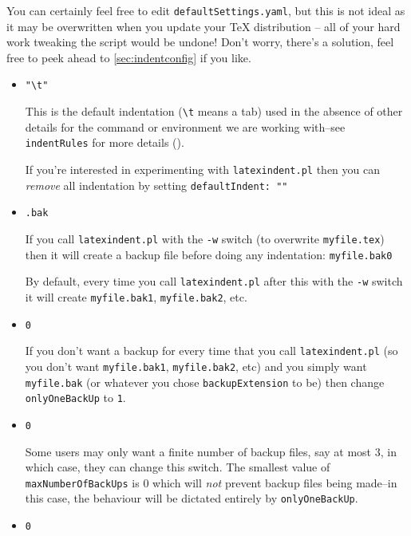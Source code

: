 \documentclass[11pt]{article}
\newcommand{\verbitem}[1]{\small\PVerb{#1}}
\begin{document}
You can certainly feel free to edit \lstinline!defaultSettings.yaml!, but
this is not ideal as it may be overwritten when you update your \TeX{} distribution --
all of your hard work tweaking the script would be undone! Don't worry,
there's a solution, feel free to peek ahead to \cref{sec:indentconfig} if you like.
\begin{itemize}
	\item[\verbitem{defaultIndent}] \lstinline!"\t"!

	      This is the default indentation (\lstinline!\t! means a tab) used in the absence of other details
	      for the command or environment we are working with--see \lstinline!indentRules!
	      for more details ().

	      If you're interested in experimenting with \lstinline!latexindent.pl! then you
	      can \emph{remove} all indentation by setting \lstinline!defaultIndent: ""!
	\item[\verbitem{backupExtension}] \lstinline!.bak!

	      If you call \lstinline!latexindent.pl! with the \lstinline!-w! switch (to overwrite
	      \lstinline!myfile.tex!) then it will create a backup file before doing
	      any indentation: \lstinline!myfile.bak0!

	      By default, every time you call \lstinline!latexindent.pl! after this with
	      the \lstinline!-w! switch it will create \lstinline!myfile.bak1!, \lstinline!myfile.bak2!,
	      etc.
	\item[\verbitem{onlyOneBackUp}] \lstinline!0!

	      \label{page:onlyonebackup}
	      If you don't want a backup for every time that you call \lstinline!latexindent.pl! (so
	      you don't want \lstinline!myfile.bak1!, \lstinline!myfile.bak2!, etc) and you simply
	      want \lstinline!myfile.bak! (or whatever you chose \lstinline!backupExtension! to be)
	      then change \lstinline!onlyOneBackUp! to \lstinline!1!.

	\item[\verbitem{maxNumberOfBackUps}]\lstinline!0!

	      Some users may only want a finite number of backup files,
	      say at most $3$, in which case, they can change this switch.
	      The smallest value of \lstinline!maxNumberOfBackUps! is $0$ which will \emph{not}
	      prevent backup files being made--in this case, the behaviour will be dictated
	      entirely by \lstinline!onlyOneBackUp!.
	\item[\verbitem{cycleThroughBackUps}]\lstinline!0!


\end{itemize}
\end{document}

